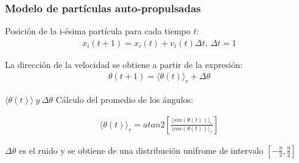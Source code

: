 %
\begin{frame}
\frametitle{Modelo de partículas auto-propulsadas}

Posición de la i-ésima partícula para cada tiempo $t$:
\begin{align}
     \boxed{x_i(t+1) = x_i(t) + v_i(t) \Delta t \text{, } \Delta t = 1}
\end{align}

La dirección de la velocidad se obtiene a partir de la expresión:
\begin{align}
    \boxed{\theta (t+1) = \langle \theta (t) \rangle_r + \Delta \theta}
\end{align}

\begin{alertblock}{$\langle \theta (t) \rangle ~ y ~ \Delta \theta$}
Cálculo del promedio de los ángulos:

\begin{align}
 \langle \theta (t) \rangle_r  = atan2 \left[ \frac{\langle sin(\theta (t)) \rangle_r}{\langle cos(\theta (t)) \rangle_r} \right]
\end{align}

$\Delta \theta$ es el ruido y se obtiene de una distribución unifrome de intervalo $[-\frac{\eta}{2}, \frac{\eta}{2}]$

\end{alertblock}

\end{frame}

